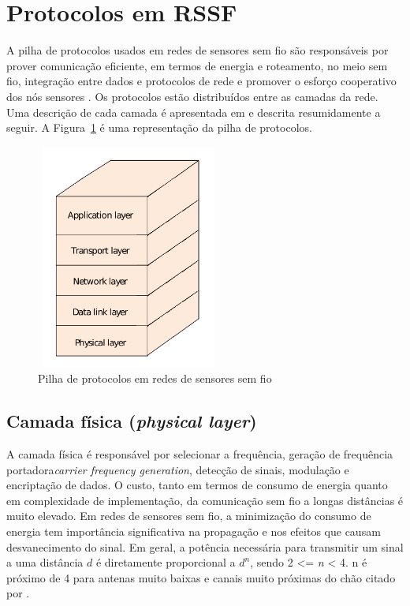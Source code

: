 \section{Protocolos em RSSF} 

A pilha de protocolos usados em redes de sensores sem fio são responsáveis por prover comunicação eficiente, em termos de energia e roteamento, no meio sem fio, integração entre dados e protocolos de rede e promover o esforço cooperativo dos nós sensores \cite{Akyildiz2002}. Os protocolos estão distribuídos entre as camadas da rede. Uma descrição de cada camada é apresentada em \cite{Akyildiz2002} e descrita resumidamente a seguir. A Figura~\ref{fig:protocolStack} é uma representação da pilha de protocolos.

\begin{figure}[!htb]
\centering
\includegraphics[width=230px,height=280px]{./Pictures/ProtocolStack.png}
\caption{Pilha de protocolos em redes de sensores sem fio} %
\label{fig:protocolStack} %
\end{figure}


 \subsection{Camada física (\textit{physical layer})} 

 A camada física é responsável por selecionar a frequência, geração de frequência portadora\textit{carrier frequency generation}, detecção de sinais, modulação e encriptação de dados. O custo, tanto em termos de consumo de energia quanto em complexidade de implementação, da comunicação sem fio a longas distâncias é muito elevado. Em redes de sensores sem fio, a minimização do consumo de energia tem importância significativa na propagação e nos efeitos que causam desvanecimento do sinal. Em geral, a potência necessária para transmitir um sinal a uma distância \textit{$d$} é diretamente proporcional a \textit{$d^{n}$}, sendo 2 <= \textit{n} < 4. n é próximo de 4 para antenas muito baixas e canais muito próximas do chão \cite{Pottie2000} citado por \cite{Akyildiz2002}.
 
